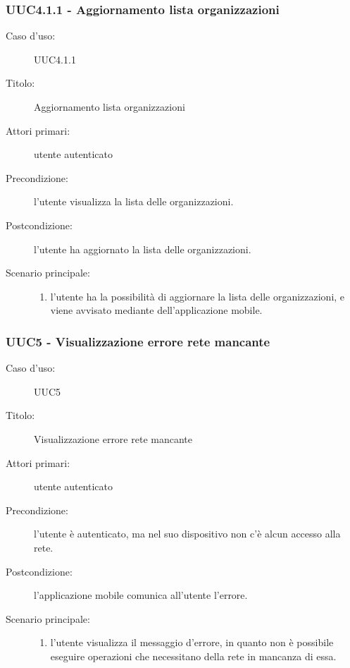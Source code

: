 \documentclass[../analisi-dei-requisiti.tex]{subfiles}
\begin{document}
\subsubsection{UUC4.1.1 - Aggiornamento lista organizzazioni}%
\label{subsub:UUC4.1.1utente}
\begin{description}
  \item[Caso d’uso:] UUC4.1.1
  \item[Titolo:] Aggiornamento lista organizzazioni
  \item[Attori primari:] utente autenticato
  \item[Precondizione:] l'utente visualizza la lista delle organizzazioni.
  \item[Postcondizione:] l'utente ha aggiornato la lista delle organizzazioni.
  \item[Scenario principale:]
        \begin{enumerate}
          \item l'utente ha la possibilità di aggiornare la lista delle organizzazioni, e viene avvisato mediante  dell'applicazione mobile.
        \end{enumerate}
\end{description}

\subsubsection{UUC5 - Visualizzazione errore rete mancante}%
\label{subsub:UUC5utente}
\begin{description}
  \item[Caso d’uso:] UUC5
  \item[Titolo:] Visualizzazione errore rete mancante
  \item[Attori primari:] utente autenticato
  \item[Precondizione:] l'utente è autenticato, ma nel suo dispositivo non c'è alcun accesso alla rete.
  \item[Postcondizione:] l'applicazione mobile comunica all'utente l'errore.
  \item[Scenario principale:]
        \begin{enumerate}
          \item l'utente visualizza il messaggio d'errore, in quanto non è possibile eseguire operazioni che necessitano della rete in mancanza di essa.
        \end{enumerate}
\end{description}
\end{document}

